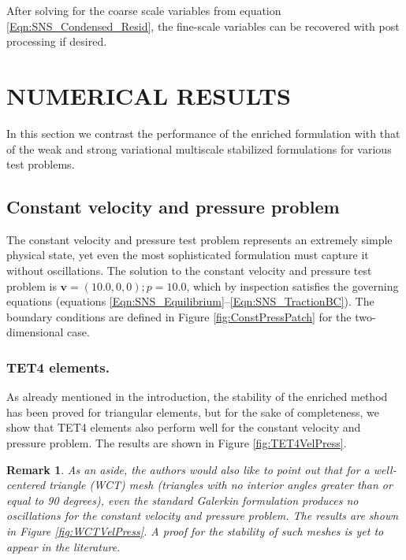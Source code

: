 \documentclass[11pt]{amsart}
\newtheorem{remark}[theorem]{Remark}
\begin{document}
After solving for the coarse scale variables from equation \eqref{Eqn:SNS_Condensed_Resid}, the fine-scale variables can be recovered with post processing if desired.
 \section{NUMERICAL RESULTS}

In this section we contrast the performance of the enriched formulation with that of the weak and strong variational multiscale stabilized formulations for various test problems. 

\subsection{Constant velocity and pressure problem}
The constant velocity and pressure test problem represents an extremely simple physical state, yet even the most sophisticated formulation must capture it without oscillations. The solution to the constant velocity and pressure test problem is $\boldsymbol{v} = (10.0,0,0); p = 10.0$, which by inspection satisfies the governing equations (equations \eqref{Eqn:SNS_Equilibrium}--\eqref{Eqn:SNS_TractionBC}).  The boundary conditions are defined in Figure \ref{fig:ConstPressPatch} for the two-dimensional case.
\subsubsection{TET4 elements.}
As already mentioned in the introduction, the stability of the enriched method has been proved for triangular elements, but for the sake of completeness, we show that TET4 elements also perform well for the constant velocity and pressure problem.  The results are shown in Figure \ref{fig:TET4VelPress}.
\begin{remark}
As an aside, the authors would also like to point out that for a well-centered triangle (WCT) mesh (triangles with no interior angles greater than or equal to 90 degrees), even the standard Galerkin formulation produces no oscillations for the constant velocity and pressure problem.  The results are shown in Figure \ref{fig:WCTVelPress}.  A proof for the stability of such meshes is yet to appear in the literature.
\end{remark}
\end{document}
